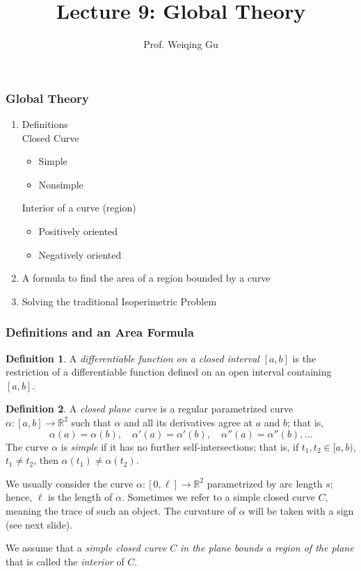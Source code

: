 \documentclass{beamer}
\title{Lecture 9: Global Theory}
\author{Prof. Weiqing Gu}
\date{}
\institute{Math 142:\\Differential Geometry}
\theoremstyle{definition}
\newtheorem{defn}{Definition}
\theoremstyle{remark}
\newcommand{\R}{\mathbb{R}}
\renewcommand{\=}{&=&}
\newcommand{\<}{\langle}
\renewcommand{\>}{\rangle}
\begin{document}
\small

\begin{frame}
\titlepage
\end{frame}

\begin{frame}[t]
\frametitle{Global Theory}
\begin{enumerate}
\item Definitions\\
Closed Curve
\begin{itemize}
\item Simple
\item Nonsimple
\end{itemize}
Interior of a curve (region)
\begin{itemize}
\item Positively oriented
\item Negatively oriented
\end{itemize}

\item A formula to find the area of a region bounded by a curve

\item Solving the traditional Isoperimetric Problem
\end{enumerate}
\end{frame}

\begin{frame}[t]
\frametitle{Definitions and an Area Formula}
\begin{defn}
A \emph{differentiable function on a closed interval} $[a,b]$ is the restriction of a differentiable
function defined on an open interval containing $[a,b]$.
\end{defn}
\pause
\begin{defn}
A \emph{closed plane curve} is a regular parametrized curve $\alpha : [a,b] \to \R^2$ such that
$\alpha$ and all its derivatives agree at $a$ and $b$; that is,
\[ \alpha(a) = \alpha(b), \quad \alpha'(a) = \alpha'(b), \quad \alpha''(a) = \alpha''(b),\ldots \]
\pause
The curve $\alpha$ is \emph{simple} if it has no further self-intersections; that is, if $t_1, t_2 \in
[a,b)$, $t_1 \ne t_2$, then $\alpha(t_1) \ne \alpha(t_2)$.
\pause\vspace{1mm}

We usually consider the curve $\alpha : [0,\ell] \to \R^2$ parametrized by arc length $s$; hence,
$\ell$ is the length of $\alpha$. Sometimes we refer to a simple closed curve $C$, meaning the
trace of such an object. The curvature of $\alpha$ will be taken with a sign (see next slide).
\pause\vspace{1mm}

We assume that a \emph{simple closed curve} $C$ \emph{in the plane bounds a region of the
plane} that is called the \emph{interior} of $C$.
\end{defn}
\end{frame}
\end{document}
